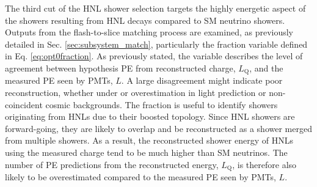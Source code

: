 The third cut of the HNL shower selection targets the highly energetic aspect of the showers resulting from HNL decays compared to SM neutrino showers.
Outputs from the flash-to-slice matching process are examined, as previously detailed in Sec. \ref{sec:subsystem_match}, particularly the fraction variable defined in Eq. \ref{eq:opt0fraction}.
As previously stated, the variable describes the level of agreement between hypothesis PE from reconstructed charge, $L_{\mathrm{Q}}$, and the measured PE seen by PMTs, $L$.
A large disagreement might indicate poor reconstruction, whether under or overestimation in light prediction or non-coincident cosmic backgrounds.
The fraction is useful to identify showers originating from HNLs due to their boosted topology.
Since HNL showers are forward-going, they are likely to overlap and be reconstructed as a shower merged from multiple showers.   
As a result, the reconstructed shower energy of HNLs using the measured charge tend to be much higher than SM neutrinos.
The number of PE predictions from the reconstructed energy, $L_{\mathrm{Q}}$, is therefore also likely to be overestimated compared to the measured PE seen by PMTs, $L$.


